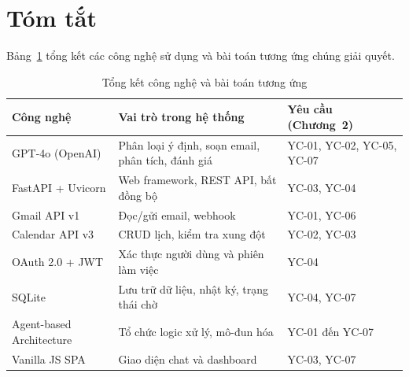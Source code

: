 \documentclass[../DoAn.tex]{subfiles}
\begin{document}
\section{Tóm tắt}

Bảng~\ref{tab:tech-summary} tổng kết các công nghệ sử dụng và bài toán tương ứng chúng giải quyết.

\begin{table}[ht]
\centering
\caption{Tổng kết công nghệ và bài toán tương ứng}
\label{tab:tech-summary}
\begin{tabular}{|l|l|l|}
\hline
\textbf{Công nghệ} & \textbf{Vai trò trong hệ thống} & \textbf{Yêu cầu (Chương~2)} \\
\hline
GPT-4o (OpenAI) & Phân loại ý định, soạn email, phân tích, đánh giá & YC-01, YC-02, YC-05, YC-07 \\
FastAPI + Uvicorn & Web framework, REST API, bất đồng bộ & YC-03, YC-04 \\
Gmail API v1 & Đọc/gửi email, webhook & YC-01, YC-06 \\
Calendar API v3 & CRUD lịch, kiểm tra xung đột & YC-02, YC-03 \\
OAuth 2.0 + JWT & Xác thực người dùng và phiên làm việc & YC-04 \\
SQLite & Lưu trữ dữ liệu, nhật ký, trạng thái chờ & YC-04, YC-07 \\
Agent-based Architecture & Tổ chức logic xử lý, mô-đun hóa & YC-01 đến YC-07 \\
Vanilla JS SPA & Giao diện chat và dashboard & YC-03, YC-07 \\
\hline
\end{tabular}
\end{table}
\end{document}
